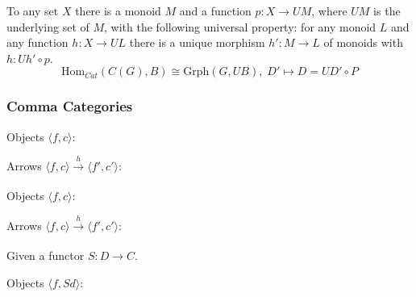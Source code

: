 \begin{corollary}
To any set $X$ there is a monoid $M$ and a function $p: X \rightarrow UM$, where $UM$ is the underlying set of $M$, with the following universal property: for any monoid $L$ and any
function $h: X \rightarrow UL$ there is a unique morphism $h': M \rightarrow L$ of monoids with $h: Uh' \circ p$.
$$\textrm{Hom}_{Cat}(C(G),B) \cong \textrm{Grph}(G,UB), \; D' \mapsto D = UD' \circ P$$
\end{corollary}

\subsubsection{Comma Categories}\label{commacategories}

\label{objectsunder}
Objects $\langle f,c \rangle$:

\begin{figure}[H]
\centering

\end{figure}

\noindent Arrows $\langle f,c \rangle \xrightarrow[]{h} \langle f',c' \rangle$:

\begin{figure}[H]
\centering

\end{figure}

\label{objectsover}

Objects $\langle f,c \rangle$:

\begin{figure}[H]
\centering

\end{figure}

\noindent Arrows $\langle f,c \rangle \xrightarrow[]{h} \langle f',c' \rangle$:

\begin{figure}[H]
\centering

\end{figure}

\label{objectsunderfunctor}

Given a functor $S:D \rightarrow C$.\newline

\noindent Objects $\langle f,Sd \rangle$:

